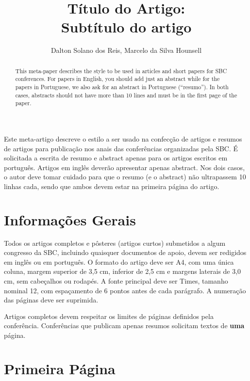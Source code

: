 \documentclass[12pt]{article}
\title{Título do Artigo:\\ Subtítulo do artigo}
\author{Dalton Solano dos Reis\inst{1}, %
    Marcelo da Silva Hounsell\inst{2} }
\begin{document}
 

\maketitle

\begin{abstract}
  This meta-paper describes the style to be used in articles and short papers for SBC conferences. For papers in English, you should add just an abstract while for the papers in Portuguese, we also ask for an abstract in Portuguese (``resumo''). In both cases, abstracts should not have more than 10 lines and must be in the first page of the paper.
\end{abstract}
     
\begin{resumo} 
  Este meta-artigo descreve o estilo a ser usado na confecção de artigos e resumos de artigos para publicação nos anais das conferências organizadas pela SBC. É solicitada a escrita de resumo e abstract apenas para os artigos escritos em português. Artigos em inglês deverão apresentar apenas abstract. Nos dois casos, o autor deve tomar cuidado para que o resumo (e o abstract) não ultrapassem 10 linhas cada, sendo que ambos devem estar na primeira página do artigo.
\end{resumo}

\section{Informações Gerais}

Todos os artigos completos e pôsteres (artigos curtos) submetidos a algum congresso da SBC, incluindo quaisquer documentos de apoio, devem ser redigidos em inglês ou em português. O formato do artigo deve ser A4, com uma única coluna, margem superior de 3,5 cm, inferior de 2,5 cm e margens laterais de 3,0 cm, sem cabeçalhos ou rodapés. A fonte principal deve ser Times, tamanho nominal 12, com espaçamento de 6 pontos antes de cada parágrafo. A numeração das páginas deve ser suprimida.

Artigos completos devem respeitar os limites de páginas definidos pela conferência. Conferências que publicam apenas resumos solicitam textos de \textbf{uma} página.

\section{Primeira Página} \label{sec:firstpage}
\end{document}
